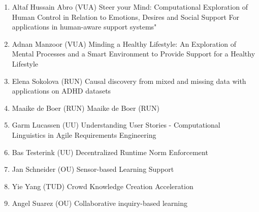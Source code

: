 \begin{multicols}{2}
\begin{scriptsize}
\begin{enumerate}[leftmargin=*,noitemsep,topsep=0pt,parsep=1pt,partopsep=0pt]
\item Altaf Hussain Abro (VUA) Steer your Mind: Computational Exploration of Human Control in Relation to Emotions, Desires and Social Support For applications in human-aware support systems"
\item Adnan Manzoor (VUA) Minding a Healthy Lifestyle: An Exploration of Mental Processes and a Smart Environment to Provide Support for a Healthy Lifestyle
\item Elena Sokolova (RUN) Causal discovery from mixed and missing data with applications on ADHD  datasets
\item Maaike de Boer (RUN) Maaike de Boer (RUN)
\item Garm Lucassen (UU) Understanding User Stories - Computational Linguistics in Agile Requirements Engineering
\item Bas Testerink (UU) Decentralized Runtime Norm Enforcement
\item Jan Schneider (OU) Sensor-based Learning Support
\item Yie Yang (TUD) Crowd Knowledge Creation Acceleration
\item Angel Suarez (OU) Collaborative inquiry-based learning
\end{enumerate}


\end{scriptsize}
\end{multicols}

